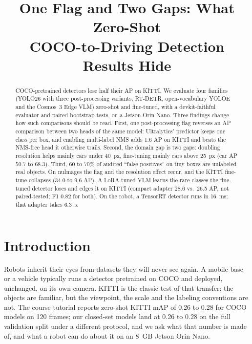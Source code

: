 \documentclass[conference]{IEEEtran}
\begin{document}
\title{One Flag and Two Gaps: What Zero-Shot\\COCO-to-Driving Detection Results Hide}
\author{
}
\maketitle

\begin{abstract}
COCO-pretrained detectors lose half their AP on KITTI. We evaluate four families (YOLO26 with three
post-processing variants, RT-DETR, open-vocabulary YOLOE and the Cosmos~3 Edge VLM) zero-shot and fine-tuned, with a
devkit-faithful evaluator and paired bootstrap tests, on a Jetson Orin Nano. Three findings change how such
comparisons should be read. First, one post-processing flag reverses an AP comparison between two heads of the same
model: Ultralytics' predictor keeps one class per box, and enabling multi-label NMS adds 1.6 AP on KITTI and beats the
NMS-free head it otherwise trails. Second, the domain gap is two gaps: doubling resolution helps mainly cars under
40~px, fine-tuning mainly cars above 25~px (car AP 50.7 to 68.3). Third, 60 to 70\% of audited ``false positives''
on tiny boxes are unlabeled real objects. On nuImages the flag and the resolution effect recur, and the KITTI
fine-tune collapses (34.0 to 9.6 AP). A LoRA-tuned VLM learns the rare classes the fine-tuned detector loses and
edges it on KITTI (compact adapter 28.6 vs.\ 26.5 AP, not paired-tested; F1 0.82 for both). On the robot, a TensorRT detector runs in
16~ms; that adapter takes 6.3~s.
\end{abstract}

\section{Introduction}
Robots inherit their eyes from datasets they will never see again. A mobile base or a vehicle typically runs a
detector pretrained on COCO \cite{lin2014coco} and deployed, unchanged, on its own camera. KITTI \cite{geiger2012kitti}
is the classic test of that transfer: the objects are familiar, but the viewpoint, the scale and the labeling
conventions are not. The course tutorial \cite{liu2026ngdet} reports zero-shot KITTI mAP of 0.26 to 0.28 for COCO
models on 120 frames; our closed-set models land at 0.26 to 0.28 on the full validation split under a different
protocol, and we ask what that number is made of, and what a robot can do about it on an 8~GB Jetson Orin Nano.
\end{document}
